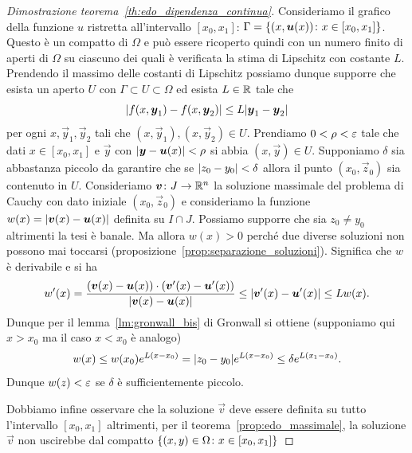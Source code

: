 \begin{proof}[Dimostrazione teorema~\ref{th:edo_dipendenza_continua}]
Consideriamo il grafico della funzione $u$ ristretta all'intervallo $[x_0,x_1]$:
$\Gamma = {\left\{ (x,\boldsymbol u(x))\colon x\in [x_0,x_1] \right\}}$.
Questo è un compatto di $\Omega$ e può essere ricoperto quindi con un numero finito 
di aperti di $\Omega$ su ciascuno dei quali è verificata la stima di Lipschitz con costante $L$.
Prendendo il massimo delle costanti di Lipschitz possiamo dunque supporre che esista 
un aperto $U$ con $\Gamma \subset U \subset \Omega$ ed esista $L\in {\mathbb R}$ tale che 
\[
  {\left|f(x,\boldsymbol y_1) - f(x,\boldsymbol y_2)\right|} \le L {\left|\boldsymbol y_1 - \boldsymbol y_2\right|}
\]
per ogni $x, \vec y_1, \vec y_2$ tali che $(x,\vec y_1), (x,\vec y_2)\in U$.
Prendiamo $0<\rho<\varepsilon$ tale che dati $x\in [x_0,x_1]$ e $\vec y$ con ${\left|\boldsymbol y- \boldsymbol u(x)\right|}<\rho$ 
si abbia $(x,\vec y)\in U$.
Supponiamo $\delta$ sia abbastanza piccolo da garantire che se ${\left|z_0-y_0\right|} < \delta$ allora il punto $(x_0,\vec z_0)$ sia contenuto in $U$.
Consideriamo $\boldsymbol v\colon J\to{\mathbb R}^n$ la soluzione massimale del problema di Cauchy con dato iniziale 
$(x_0,\vec z_0)$ e consideriamo la funzione $w(x) = {\left|\boldsymbol v(x) - \boldsymbol u(x)\right|}$ definita su $I\cap J$.
Possiamo supporre che sia $z_0\neq y_0$ altrimenti la tesi è banale.
Ma allora $w(x) > 0$ perché due diverse soluzioni non possono 
mai toccarsi (proposizione~\ref{prop:separazione_soluzioni}).
Significa che $w$ è derivabile e si ha 
\[
 w'(x) 
 = \frac{(\boldsymbol v(x) - \boldsymbol u(x))\cdot (\boldsymbol v'(x) - \boldsymbol u'(x))}{{\left|\boldsymbol v(x) - \boldsymbol u(x)\right|}}
 \le {\left|\boldsymbol v'(x) - \boldsymbol u'(x)\right|}
 \le L w(x).
\]
Dunque per il lemma~\ref{lm:gronwall_bis} di Gronwall si ottiene 
(supponiamo qui $x>x_0$ ma il caso $x<x_0$ è analogo)
\[
  w(x) \le w(x_0) e^{L(x-x_0)} = {\left|z_0-y_0\right|} e^{L(x-x_0)}
  \le \delta e^{L(x_1-x_0)}.
\]
Dunque $w(z) < \varepsilon$ se $\delta$ è sufficientemente piccolo.

Dobbiamo infine osservare che la soluzione $\vec v$ deve essere definita 
su tutto l'intervallo $[x_0,x_1]$ altrimenti, per il teorema~\ref{prop:edo_massimale},
la soluzione $\vec v$ non uscirebbe dal
compatto ${\left\{ (x,y)\in \Omega\colon x\in [x_0,x_1] \right\}}$
\end{proof}
